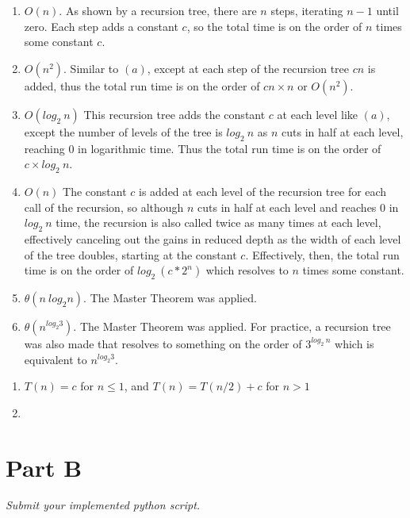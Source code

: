 \documentclass[12pt,twoside]{article}
\begin{document}
\begin{problems}
\problem  %

\begin{problemparts}
\problempart
\begin{enumerate}
\item $O(n)$. As shown by a recursion tree, there are $n$ steps, iterating $n-1$ until zero. Each step adds a constant $c$, so the total time is on the order of $n$ times some constant $c$.
\item $O(n^{2})$. Similar to $(a)$, except at each step of the recursion tree $cn$ is added, thus the total run time is on the order of $cn \times n$ or $O(n^{2})$.
\item $O(log_2\ n)$ This recursion tree adds the constant $c$ at each level like $(a)$, except the number of levels of the tree is $log_2\ n$ as $n$ cuts in half at each level, reaching $0$ in logarithmic time. Thus the total run time is on the order of $c \times log_2\ n$. 
\item $O(n)$ The constant $c$ is added at each level of the recursion tree for each call of the recursion, so although $n$ cuts in half at each level and reaches $0$ in $log_2\ n$ time, the recursion is also called twice as many times at each level, effectively canceling out the gains in reduced depth as the width of each level of the tree doubles, starting at the constant $c$. Effectively, then, the total run time is on the order of $log_2\ (c*2^{n})$ which resolves to $n$ times some constant.
\item $\theta(n\ log_{2} n)$. The Master Theorem was applied.
\item $\theta(n^{log_{2} 3})$. The Master Theorem was applied. For practice, a recursion tree was also made that resolves to something on the order of $3^{log_2\ n}$ which is equivalent to $n^{log_{2} 3}$.
\end{enumerate}
\problempart
\begin{enumerate}
\item $T(n) = c  $ for $n \leq 1$, and $T(n) = T(n/2) + c$ for $n > 1$
\item
\end{enumerate}
\end{problemparts}

\problem  %
\begin{problemparts}
\problempart
\problempart
\end{problemparts}

\section*{Part B}
\problem  %
\begin{problemparts}
\emph{Submit your implemented python script.}
\problempart
\problempart
\problempart
\problempart
\problempart
\end{problemparts}
\end{problems}
\end{document}

